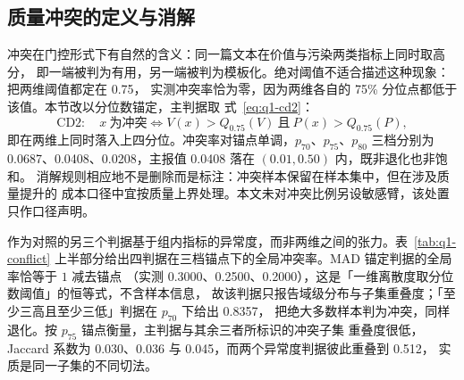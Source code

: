 \subsection{质量冲突的定义与消解}
\label{subsec:q1-conflict}

冲突在门控形式下有自然的含义：同一篇文本在价值与污染两类指标上同时取高分，
即一端被判为有用，另一端被判为模板化。绝对阈值不适合描述这种现象：把两维阈值都定在 0.75，
实测冲突率恰为零，因为两维各自的 75\% 分位点都低于该值。本节改以分位数锚定，主判据取
式~\eqref{eq:q1-cd2}：
\begin{equation}
  \text{CD2}:\quad x\ \text{为冲突}\iff V(x)>Q_{0.75}(V)\ \text{且}\ P(x)>Q_{0.75}(P),
  \label{eq:q1-cd2}
\end{equation}
即在两维上同时落入上四分位。冲突率对锚点单调，$p_{70}$、$p_{75}$、$p_{80}$ 三档分别为
0.0687、0.0408、0.0208，主报值 0.0408 落在 $(0.01,0.50)$ 内，既非退化也非饱和。
消解规则相应地不是删除而是标注：冲突样本保留在样本集中，但在涉及质量提升的
成本口径中宜按质量上界处理。本文未对冲突比例另设敏感臂，该处置只作口径声明。

作为对照的另三个判据基于组内指标的异常度，而非两维之间的张力。表~\ref{tab:q1-conflict}
上半部分给出四判据在三档锚点下的全局冲突率。MAD 锚定判据的全局率恰等于 $1$ 减去锚点
（实测 0.3000、0.2500、0.2000），这是「一维离散度取分位数阈值」的恒等式，不含样本信息，
故该判据只报告域级分布与子集重叠度；「至少三高且至少三低」判据在 $p_{70}$ 下给出 0.8357，
把绝大多数样本判为冲突，同样退化。按 $p_{75}$ 锚点衡量，主判据与其余三者所标识的冲突子集
重叠度很低，Jaccard 系数为 0.030、0.036 与 0.045，而两个异常度判据彼此重叠到 0.512，
实质是同一子集的不同切法。

